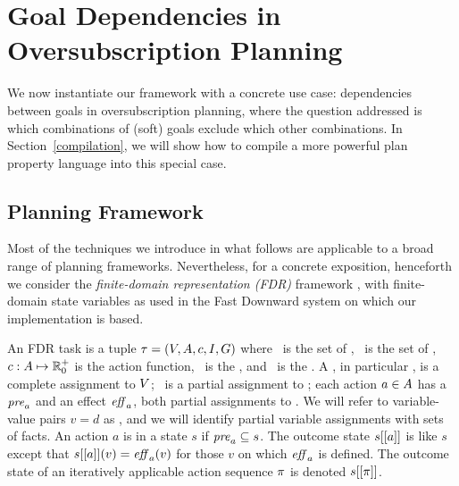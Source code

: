 \section{Goal Dependencies in Oversubscription Planning}
\label{goaldep}


We now instantiate our framework with a concrete use case:
dependencies between goals in oversubscription planning, where the
question addressed is which combinations of (soft) goals exclude which
other combinations. In Section~\ref{compilation}, we will show how to
compile a more powerful plan property language into this special case.




\subsection{Planning Framework}
\label{goaldep:planning}

Most of the techniques we introduce in what follows are applicable to
a broad range of planning frameworks. Nevertheless, for a concrete
exposition, henceforth we consider the \emph{finite-domain
  representation (FDR)} framework
\cite{backstrom:nebel:ci-95,helmert:ai-09}, with finite-domain state
variables as used in the Fast Downward system \cite{helmert:jair-06}
on which our implementation is based.

An FDR task  is a tuple $\tau =
(V,A,{c},I,G)$ where \vars\ is the set of
, \acts\ is the set of , ${c}:
A \mapsto {\mathbb{R}}^+_0$ is the action  function,
\init\ is the , and \goal\ is the
. A , in particular \init, is a complete
assignment to $V$; \goal\ is a partial assignment to \vars; each
action $a \in A$ has a  $\mathit{pre}_a$ and an
effect $\mathit{eff}_a$, both partial assignments to \vars. We will refer to
variable-value pairs $v=d$ as , and we will identify
partial variable assignments with sets of facts.
%
An action $a$ is  in a state $s$ if $\mathit{pre}_a
\subseteq s$. The outcome state $s[[a]]$ is like $s$ except that
$s[[a]](v) = \mathit{eff}_a(v)$ for those $v$ on which $\mathit{eff}_a$ is
defined. The outcome state of an iteratively applicable action
sequence $\pi$ is denoted $s[[\pi]]$.

